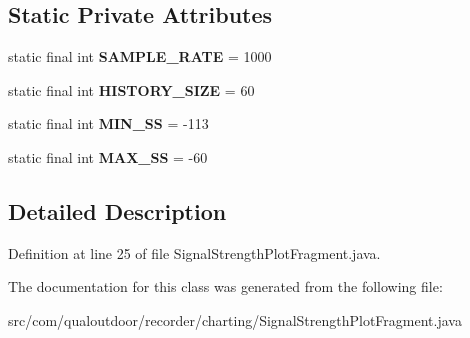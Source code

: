 \subsection*{Static Private Attributes}
\begin{DoxyCompactItemize}
\item 
\hypertarget{classcom_1_1qualoutdoor_1_1recorder_1_1charting_1_1SignalStrengthPlotFragment_aa6d119ce9035b9702eb896eca26e2c21}{static final int {\bfseries S\-A\-M\-P\-L\-E\-\_\-\-R\-A\-T\-E} = 1000}\label{classcom_1_1qualoutdoor_1_1recorder_1_1charting_1_1SignalStrengthPlotFragment_aa6d119ce9035b9702eb896eca26e2c21}

\item 
\hypertarget{classcom_1_1qualoutdoor_1_1recorder_1_1charting_1_1SignalStrengthPlotFragment_a5221a8dba9576dce9067909e4b7da1bb}{static final int {\bfseries H\-I\-S\-T\-O\-R\-Y\-\_\-\-S\-I\-Z\-E} = 60}\label{classcom_1_1qualoutdoor_1_1recorder_1_1charting_1_1SignalStrengthPlotFragment_a5221a8dba9576dce9067909e4b7da1bb}

\item 
\hypertarget{classcom_1_1qualoutdoor_1_1recorder_1_1charting_1_1SignalStrengthPlotFragment_ad09ee6d037a562b4fcbe7971e8f4c7a8}{static final int {\bfseries M\-I\-N\-\_\-\-S\-S} = -\/113}\label{classcom_1_1qualoutdoor_1_1recorder_1_1charting_1_1SignalStrengthPlotFragment_ad09ee6d037a562b4fcbe7971e8f4c7a8}

\item 
\hypertarget{classcom_1_1qualoutdoor_1_1recorder_1_1charting_1_1SignalStrengthPlotFragment_a5488d5038578b49d6ec52ee159dbcf30}{static final int {\bfseries M\-A\-X\-\_\-\-S\-S} = -\/60}\label{classcom_1_1qualoutdoor_1_1recorder_1_1charting_1_1SignalStrengthPlotFragment_a5488d5038578b49d6ec52ee159dbcf30}

\end{DoxyCompactItemize}


\subsection{Detailed Description}


Definition at line 25 of file Signal\-Strength\-Plot\-Fragment.\-java.



The documentation for this class was generated from the following file\-:\begin{DoxyCompactItemize}
\item 
src/com/qualoutdoor/recorder/charting/Signal\-Strength\-Plot\-Fragment.\-java\end{DoxyCompactItemize}
